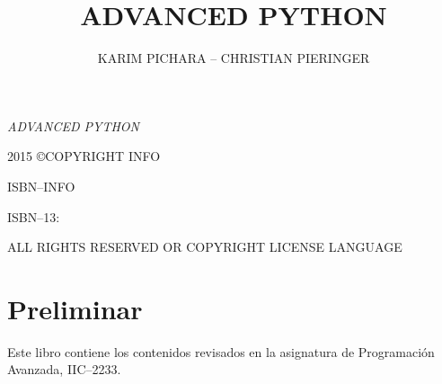 \documentclass[10pt,twoside,openright]{memoir}
\author{KARIM PICHARA -- CHRISTIAN PIERINGER}
\title{ADVANCED PYTHON}
\date{}
\makeatletter
\def\maketitle{%
  \null
  \thispagestyle{empty}%
  \vfill
  \begin{center}\leavevmode
    \normalfont
    {\large\raggedleft \@author\par}%
    \hrulefill\par
    {\huge\raggedright \@title\par}%
    \vskip 1cm
  \end{center}%
  \vfill
  \null
  \cleardoublepage
  }
\makeatother
\begin{document}
\let\cleardoublepage\clearpage


\maketitle






\frontmatter

\null\vfill

\begin{flushleft}
\textit{ADVANCED PYTHON}


2015 \copyright  COPYRIGHT INFO


ISBN--INFO

ISBN--13:
\bigskip

ALL RIGHTS RESERVED OR COPYRIGHT LICENSE LANGUAGE

\end{flushleft}
\let\cleardoublepage\clearpage

\mainmatter
\sloppy

\section *{Preliminar}
Este libro contiene los contenidos revisados en la asignatura de Programación Avanzada, IIC--2233.

\newpage
\tableofcontents

\newpage




\end{document}
